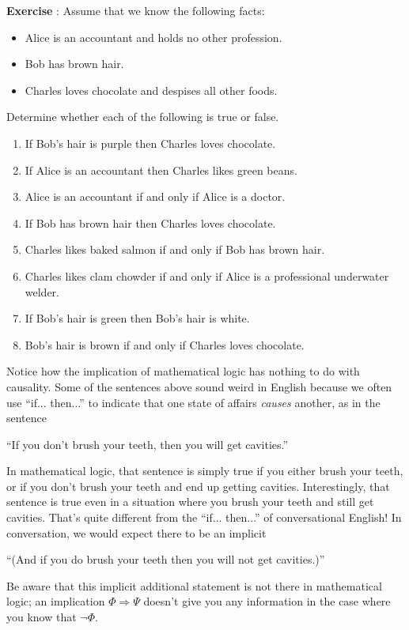 \documentclass[12pt]{article}
\newcommand{\ARR}{\Rightarrow}
\newcounter{exercise}
\def\putExerciseHeading{\refstepcounter{exercise} \textbf{Exercise \theexercise}}
\newcommand{\ex}[1]{ \putExerciseHeading: #1}
\def\pA{\Phi}
\def\pB{\Psi}
\begin{document}
\ex{
Assume that we know the following facts:
\begin{itemize}
\item Alice is an accountant and holds no other profession.
\item Bob has brown hair.
\item Charles loves chocolate and despises all other foods.
\end{itemize}
Determine whether each of the following is true or false.
\begin{enumerate}


\item %
If
Bob's hair is purple
then
Charles loves chocolate.


\item %
If
Alice is an accountant
then
Charles likes green beans.


\item %
Alice is an accountant
if and only if
Alice is a doctor.


\item %
If
Bob has brown hair
then
Charles loves chocolate.


\item %
Charles likes baked salmon
if and only if
Bob has brown hair.


\item %
Charles likes clam chowder
if and only if
Alice is a professional underwater welder.

\item %
If
Bob's hair is green
then
Bob's hair is white.

\item %
Bob's hair is brown
if and only if
Charles loves chocolate.


\end{enumerate}

Notice how the implication of mathematical logic has nothing to do with causality.
Some of the sentences above sound weird in English because we often use ``if... then...'' to 
indicate that one state of affairs \emph{causes} another, as in the sentence
\begin{center}``If you don't brush your teeth, then you will get cavities.''\end{center}
In mathematical logic, that sentence is simply true if you either brush your teeth, or if you don't brush your teeth and end up getting cavities.
Interestingly, that sentence is true even in a situation where you brush your teeth and still get cavities.
That's quite different from the ``if... then...'' of conversational English!
In conversation, we would expect there to be an implicit
\begin{center}``(And if you do brush your teeth then you will not get cavities.)''\end{center}
Be aware that this implicit additional statement is not there in mathematical logic; 
an implication $\pA\ARR\pB$ doesn't give you any information in the case where you know that $\neg\pA$.
}
\end{document}
